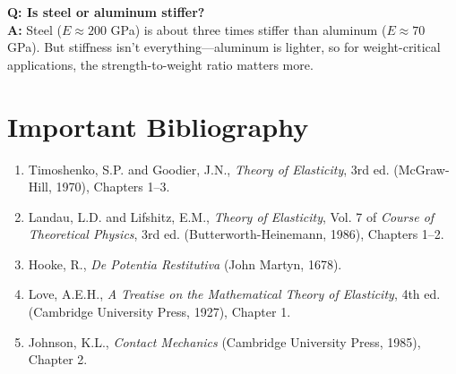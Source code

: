 \textbf{Q: Is steel or aluminum stiffer?}\\
\textbf{A:} Steel ($E \approx 200$ GPa) is about three times stiffer than aluminum ($E \approx 70$ GPa). But stiffness isn't everything---aluminum is lighter, so for weight-critical applications, the strength-to-weight ratio matters more.
\section*{Important Bibliography}

\begin{enumerate}
\item Timoshenko, S.P. and Goodier, J.N., \textit{Theory of Elasticity}, 3rd ed. (McGraw-Hill, 1970), Chapters 1--3.
\item Landau, L.D. and Lifshitz, E.M., \textit{Theory of Elasticity}, Vol. 7 of \textit{Course of Theoretical Physics}, 3rd ed. (Butterworth-Heinemann, 1986), Chapters 1--2.
\item Hooke, R., \textit{De Potentia Restitutiva} (John Martyn, 1678).
\item Love, A.E.H., \textit{A Treatise on the Mathematical Theory of Elasticity}, 4th ed. (Cambridge University Press, 1927), Chapter 1.
\item Johnson, K.L., \textit{Contact Mechanics} (Cambridge University Press, 1985), Chapter 2.
\end{enumerate}


